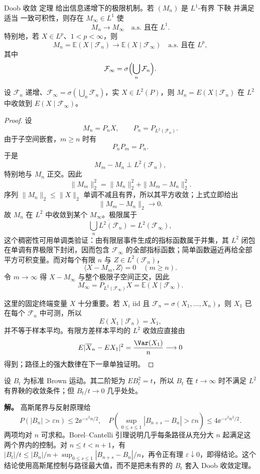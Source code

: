 Doob 收敛 定理 给出信息递增下的极限机制。若 $(M_n)$ 是 $L^1$-有界 下鞅 并满足适当 一致可积性，则存在 $M_\infty\in L^1$ 使
\[
M_n\to M_\infty
\quad\text{a.s. 且在 }L^1.
\]
特别地，若 $X\in L^p$、$1<p<\infty$，则
\begin{equation*}M_n=\mathbb E(X\mid\mathcal F_n)
\longrightarrow
\mathbb E(X\mid\mathcal F_\infty)
\quad\text{a.s. 且在 }L^p,\end{equation*}
其中
\[
\mathcal F_\infty
=\sigma\Bigl(\bigcup_n\mathcal F_n\Bigr).
\]
\begin{proposition}[递增信息的平方可积投影极限]
设 $\mathcal F_n$ 递增、$\mathcal F_\infty=\sigma(\bigcup_n\mathcal F_n)$，实 $X\in L^2(P)$，则 $M_n=E(X\mid\mathcal F_n)$ 在 $L^2$ 中收敛到 $E(X\mid\mathcal F_\infty)$。
\end{proposition}
\begin{proof}
设
\[
M_n=P_nX,
\qquad
P_n=P_{L^2(\mathcal F_n)}.
\]
由于子空间嵌套，$m\ge n$ 时有
\[
P_nP_m=P_n.
\]
于是
\[
M_m-M_n
\perp L^2(\mathcal F_n),
\]
特别地与 $M_n$ 正交。因此
\[
\|M_m\|_2^2
=\|M_n\|_2^2+\|M_m-M_n\|_2^2.
\]
序列 $\|M_n\|_2\le\|X\|_2$ 单调不减且有界，所以其平方收敛；上式立即给出
\[
\|M_m-M_n\|_2\to0.
\]
故 $M_n$ 在 $L^2$ 中收敛到某个 $M_\infty$。极限属于
\[
\overline{\bigcup_nL^2(\mathcal F_n)}
=L^2(\mathcal F_\infty),
\]
这个稠密性可用单调类验证：由有限层事件生成的指标函数属于并集，其 $L^2$ 闭包在单调有界极限下封闭，因而包含 $\mathcal F_\infty$ 的全部指标函数；简单函数逼近再给全部平方可积变量。而对每个有限 $n$ 与 $Z\in L^2(\mathcal F_n)$，
\[
\langle X-M_m,Z\rangle=0
\quad(m\ge n).
\]
令 $m\to\infty$ 得 $X-M_\infty$ 与整个极限子空间正交，因此
\[
M_\infty=P_{L^2(\mathcal F_\infty)}X
=\mathbb E(X\mid\mathcal F_\infty).
\]

这里的固定终端变量 $X$ 十分重要。若 $X_i$ iid 且 $\mathcal F_n=\sigma(X_1,\ldots,X_n)$，则 $X_1$ 已在每个 $\mathcal F_n$ 中可测，所以
\[
E(X_1\mid\mathcal F_n)=X_1,
\]
并不等于样本平均。有限方差样本平均的 $L^2$ 收敛应直接由
\[
E|\overline X_n-EX_1|^2=\frac{\Var(X_1)}n\longrightarrow0
\]
得到；路径上的强大数律在下一章单独证明。

\end{proof}


\begin{example}
设 $B_t$ 为标准 Brown 运动。其二阶矩为 $EB_t^2=t$，所以 $B_t$ 在 $t\to\infty$ 时不满足 $L^2$ 有界鞅的收敛条件；但 $B_t/t\to0$ 几乎处处。

\textbf{解。} 高斯尾界与反射原理给
\[
P(|B_n|>\varepsilon n)\le2\ee^{-\varepsilon^2n/2},
\quad
P\!\left(\sup_{0\le s\le1}|B_{n+s}-B_n|>\varepsilon n\right)
\le4\ee^{-\varepsilon^2n^2/2}.
\]
两项均对 $n$ 可求和。Borel--Cantelli 引理说明几乎每条路径从充分大 $n$ 起满足这两个界内的控制。对 $n\le t<n+1$，有 $|B_t|/t\le|B_n|/n+\sup_{0\le s\le1}|B_{n+s}-B_n|/n$，再令正有理 $\varepsilon\downarrow0$，即得结论。这个结论使用高斯尾控制与路径最大值，而不是把未有界的 $B_t$ 套入 Doob 收敛定理。
\end{example}


